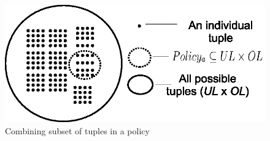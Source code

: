 
 	\begin{figure}
 		\centering
 		\includegraphics[width=.4\textwidth]{ABAC16/tuples-vs-policy}
 		\caption{Combining subset of tuples in a policy}
 		\label{fig:policy-vs-tuples}
 	\end{figure}